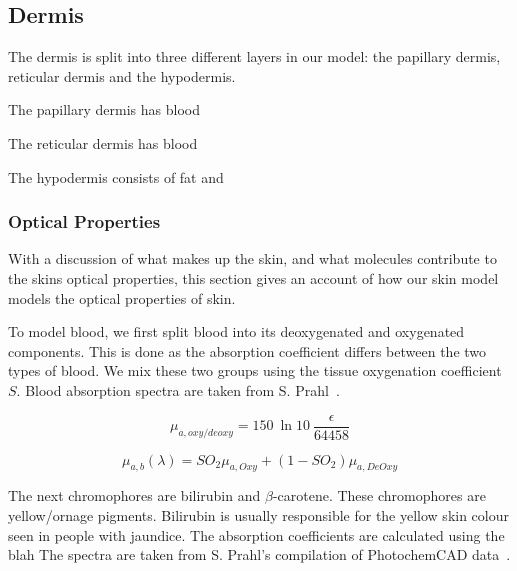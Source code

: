 \subsection*{Dermis} %
\label{sub:dermis}

The dermis is split into three different layers in our model: the papillary dermis, reticular dermis and the hypodermis.

The papillary dermis has blood

The reticular dermis has blood

The hypodermis consists of fat and  


\subsubsection*{Optical Properties} %
\label{sub:optical_properties}



With a discussion of what makes up the skin, and what molecules contribute to the skins optical properties, this section gives an account of how our skin model models the optical properties of skin.

To model blood, we first split blood into its deoxygenated and oxygenated components.
This is done as the absorption coefficient differs between the two types of blood. We mix these two groups using the tissue oxygenation coefficient $S$. Blood absorption spectra are taken from S. Prahl~\cite{prahlblood}.

\begin{equation}
\mu_{a,oxy/deoxy}=150\ \ln10\ \frac{\epsilon}{64458}
\label{eqn:oxy}
\end{equation}

\begin{equation}
\mu_{a,b}(\lambda) = SO_2\mu_{a,Oxy}+(1-SO_2)\mu_{a,DeOxy}
\label{eqn:blood}
\end{equation}

The next chromophores are bilirubin and $\beta$-carotene.
These chromophores are yellow/ornage pigments. 
Bilirubin is usually responsible for the yellow skin colour seen in people with jaundice.
The absorption coefficients are calculated using the blah 
The spectra are taken from S. Prahl's compilation of PhotochemCAD data~\cite{prahlcaro,prahlbili}.

